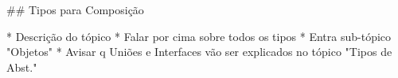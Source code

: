 ## Tipos para Composição

* Descrição do tópico
* Falar por cima sobre todos os tipos
* Entra sub-tópico "Objetos"
* Avisar q Uniões e Interfaces vão ser explicados no tópico "Tipos de Abst."
